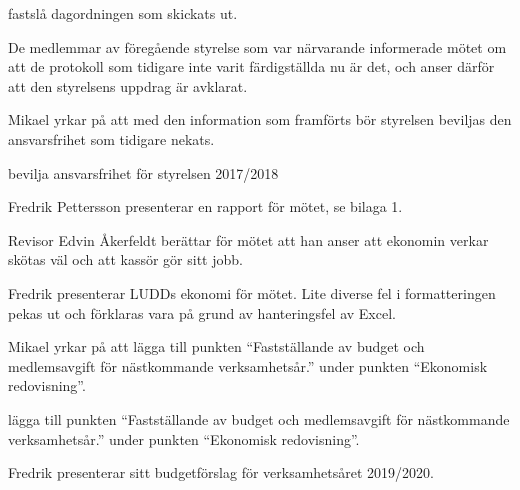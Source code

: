 \documentclass{protokoll}
\begin{document}
\newpage  


\begin{beslut}
     \att fastslå dagordningen som skickats ut.
\end{beslut}

De medlemmar av föregående styrelse som var närvarande informerade mötet om att
de protokoll som tidigare inte varit färdigställda nu är det, och anser därför
att den styrelsens uppdrag är avklarat. 

Mikael yrkar på att med den information som framförts bör styrelsen beviljas
den ansvarsfrihet som tidigare nekats. 

\begin{beslut}
  \att bevilja ansvarsfrihet för styrelsen 2017/2018
\end{beslut}

Fredrik Pettersson presenterar en rapport för mötet, se bilaga 1.

Revisor Edvin Åkerfeldt berättar för mötet att han anser att ekonomin verkar
skötas väl och att kassör gör sitt jobb. 

Fredrik presenterar LUDDs ekonomi för mötet. 
Lite diverse fel i formatteringen pekas ut och förklaras vara på grund av
hanteringsfel av Excel. 

Mikael yrkar på att lägga till punkten ``Fastställande av budget och medlemsavgift för nästkommande
verksamhetsår.'' under punkten ``Ekonomisk redovisning''. 
\begin{beslut}
\att lägga till punkten ``Fastställande av budget och medlemsavgift för nästkommande
verksamhetsår.'' under punkten ``Ekonomisk redovisning''.
\end{beslut}
Fredrik presenterar sitt budgetförslag för verksamhetsåret 2019/2020.
\end{document}

